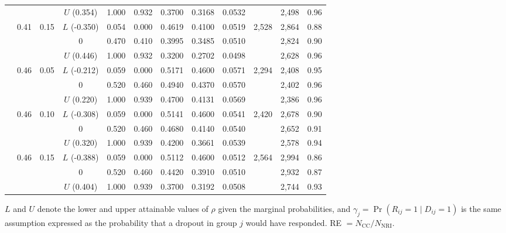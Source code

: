 \begin{table}[htbp]
\begin{threeparttable}
\begin{tabular}{cccccccccrrr}
     &  &  & $U$ (0.354) & 1.000 & 0.932 & 0.3700 & 0.3168 & 0.0532 &  & 2,498 & 0.96 \\
    \addlinespace
    0.47 & 0.41 & 0.15 & $L$ (-0.350) & 0.054 & 0.000 & 0.4619 & 0.4100 & 0.0519 & 2,528 & 2,864 & 0.88 \\
     &  &  & $0$ & 0.470 & 0.410 & 0.3995 & 0.3485 & 0.0510 &  & 2,824 & 0.90 \\
     &  &  & $U$ (0.446) & 1.000 & 0.932 & 0.3200 & 0.2702 & 0.0498 &  & 2,628 & 0.96 \\
    \addlinespace
    0.52 & 0.46 & 0.05 & $L$ (-0.212) & 0.059 & 0.000 & 0.5171 & 0.4600 & 0.0571 & 2,294 & 2,408 & 0.95 \\
     &  &  & $0$ & 0.520 & 0.460 & 0.4940 & 0.4370 & 0.0570 &  & 2,402 & 0.96 \\
     &  &  & $U$ (0.220) & 1.000 & 0.939 & 0.4700 & 0.4131 & 0.0569 &  & 2,386 & 0.96 \\
    \addlinespace
    0.52 & 0.46 & 0.10 & $L$ (-0.308) & 0.059 & 0.000 & 0.5141 & 0.4600 & 0.0541 & 2,420 & 2,678 & 0.90 \\
     &  &  & $0$ & 0.520 & 0.460 & 0.4680 & 0.4140 & 0.0540 &  & 2,652 & 0.91 \\
     &  &  & $U$ (0.320) & 1.000 & 0.939 & 0.4200 & 0.3661 & 0.0539 &  & 2,578 & 0.94 \\
    \addlinespace
    0.52 & 0.46 & 0.15 & $L$ (-0.388) & 0.059 & 0.000 & 0.5112 & 0.4600 & 0.0512 & 2,564 & 2,994 & 0.86 \\
     &  &  & $0$ & 0.520 & 0.460 & 0.4420 & 0.3910 & 0.0510 &  & 2,932 & 0.87 \\
     &  &  & $U$ (0.404) & 1.000 & 0.939 & 0.3700 & 0.3192 & 0.0508 &  & 2,744 & 0.93 \\
    \bottomrule
  \end{tabular}
  \begin{tablenotes}[flushleft]\footnotesize
    \item $L$ and $U$ denote the lower and upper attainable values of $\rho$ given the marginal probabilities, and $\gamma_{j} = \Pr(R_{ij} = 1 \mid D_{ij} = 1)$ is the same assumption expressed as the probability that a dropout in group $j$ would have responded. RE $= N_{\mathrm{CC}} / N_{\mathrm{NRI}}$.
  \end{tablenotes}
  \end{threeparttable}
\end{table}
